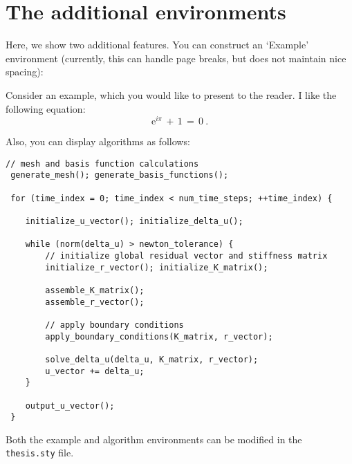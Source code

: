 %
%

\section{The additional environments} \label{sec_additional_environments}

Here, we show two additional features.  
You can construct an `Example' environment (currently, this can handle page breaks, but does not maintain nice spacing):

\begin{example}
	Consider an example, which you would like to present to the reader.
	I like the following equation:
	\begin{equation*}
		\mathrm{e}^{i \pi}
		\, + \, 1
		\, = \, 0
		~.
	\end{equation*}
\end{example}


\noindent Also, you can display algorithms as follows:

\begin{lstlisting}[caption={\texttt{C++} pseudocode of an algorithm}]
 // mesh and basis function calculations
 generate_mesh(); generate_basis_functions();

 for (time_index = 0; time_index < num_time_steps; ++time_index) {

	initialize_u_vector(); initialize_delta_u();

	while (norm(delta_u) > newton_tolerance) {
		// initialize global residual vector and stiffness matrix
		initialize_r_vector(); initialize_K_matrix();

		assemble_K_matrix();
		assemble_r_vector();

		// apply boundary conditions
		apply_boundary_conditions(K_matrix, r_vector);

		solve_delta_u(delta_u, K_matrix, r_vector);
		u_vector += delta_u;
	}

	output_u_vector();
 }
\end{lstlisting}

\noindent Both the example and algorithm environments can be modified in the \texttt{thesis.sty} file.
\newpage



